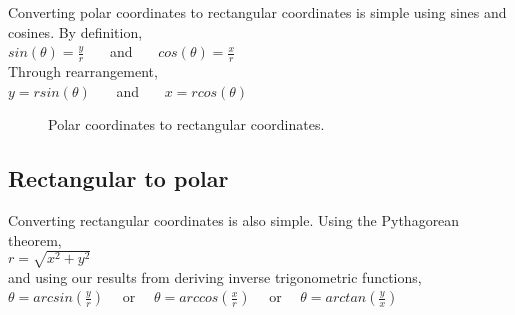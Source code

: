 Converting polar coordinates to rectangular coordinates is simple using sines and cosines.  By definition, \\

\tab$sin(\theta) = \frac{y}{r}$  \ \ \ and \ \ \  $cos(\theta)=\frac{x}{r}$\\

Through rearrangement,\\

\tab$y = rsin(\theta)$ \ \ \ and \ \ \ $x = rcos(\theta)$

\begin{figure}[htb!]
\center
\caption{Polar coordinates to rectangular coordinates.}
\label{fig:Polar coordinates to rectangular coordinates.}
\end{figure}

\subsection{Rectangular to polar}

Converting rectangular coordinates is also simple.  Using the Pythagorean theorem, \\

\tab$r = \sqrt{x^2 + y^2}$\\

and using our results from deriving inverse trigonometric functions, \\

\tab$\theta = arcsin(\frac{y}{r})$ \ \ or \ \ $\theta = arccos(\frac{x}{r})$ \ \ or \ \ $\theta = arctan(\frac{y}{x})$

